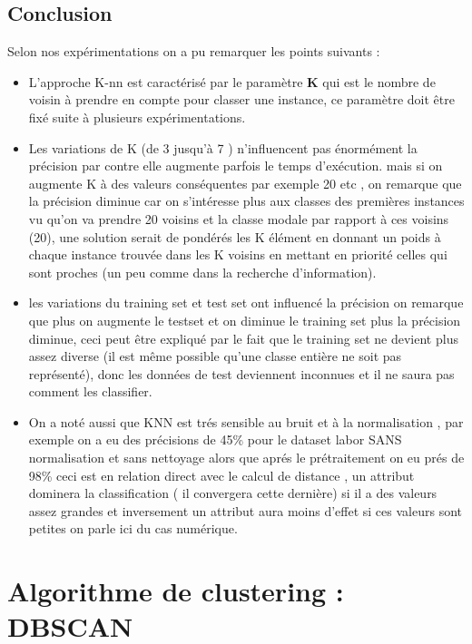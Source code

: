 \documentclass[12pt,a4paper,oneside]{book}
\begin{document}
	
	
	\newpage
	
	\section{Conclusion}
	Selon nos expérimentations on a pu remarquer les points suivants :
	
	
	\begin{itemize}
		\item L'approche K-nn est caractérisé par le paramètre \textbf{K} qui est le nombre de voisin à prendre en compte pour classer une instance, ce paramètre doit être fixé suite à plusieurs expérimentations.
		
		\item Les variations de K  (de 3 jusqu'à 7 ) n'influencent  pas énormément la précision par contre elle augmente parfois le temps d'exécution. mais si on augmente K à des valeurs conséquentes par exemple 20 etc , on remarque que la précision diminue car on s'intéresse plus aux classes des premières instances vu qu'on va prendre 20 voisins et la classe modale  par rapport à ces voisins (20), une solution serait de pondérés les K élément en donnant un poids à chaque instance trouvée dans les K voisins en mettant en priorité celles qui sont proches (un peu comme dans la recherche d'information).
		
		\item les variations du training set et test set ont influencé la précision on remarque que plus on augmente le testset et on diminue le training set plus la précision diminue, ceci peut être expliqué par le fait que  le training set ne devient plus assez diverse (il est même possible qu'une classe entière ne soit pas représenté), donc les données de test deviennent inconnues et il ne saura pas comment les classifier.
		\item On a noté aussi que KNN est trés sensible au bruit et à la normalisation , par exemple on a eu des précisions de 45\% pour le dataset labor SANS normalisation et sans nettoyage alors que aprés le prétraitement on eu prés de 98\% ceci est en relation direct avec le calcul de distance , un attribut dominera la classification ( il convergera cette dernière)  si il a des valeurs assez grandes et inversement un attribut aura moins d'effet si ces valeurs sont petites on parle ici du cas numérique.
	\end{itemize}
	\chapter{Algorithme de clustering : DBSCAN}
\end{document}
